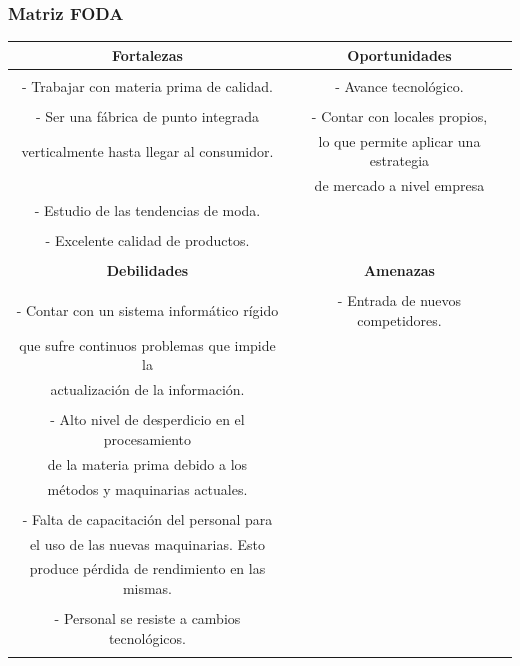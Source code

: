 \documentclass[a4paper,10pt,titlepage]{article}
\begin{document}
\subsubsection{Matriz FODA}
	\vspace*{0.5cm}
	\begin{tabular}{|c|c|}
	\hline 
	\textbf{Fortalezas} & \textbf{Oportunidades} \\ \hline & \\
- Trabajar con materia prima de calidad. & - Avance tecnol\'{o}gico.\\ &\\
- Ser una f\'{a}brica de punto integrada & - Contar con locales propios,\\ 
  verticalmente hasta llegar al consumidor. & lo que permite aplicar una estrategia\\ & de mercado a nivel empresa \\
- Estudio de las tendencias de moda. & \\ & \\
- Excelente calidad de productos.& \\& \\

	\hline
	\textbf{Debilidades} & \textbf{Amenazas} \\
	\hline &\\
- Contar con un sistema inform\'{a}tico r\'{i}gido& - Entrada de nuevos competidores. \\que sufre continuos problemas que impide la &\\ actualizaci\'{o}n de la informaci\'{o}n. &\\ &\\
- Alto nivel de desperdicio en el procesamiento &\\ de la materia prima debido a los &\\ m\'{e}todos y maquinarias actuales. &\\ &\\
- Falta de capacitaci\'{o}n del personal para &\\el uso de las nuevas maquinarias. Esto &\\ produce p\'{e}rdida de rendimiento en las mismas. &\\ &\\
- Personal se resiste a cambios tecnol\'{o}gicos. &\\ &\\
	\hline    
	\end{tabular}
\end{document}
